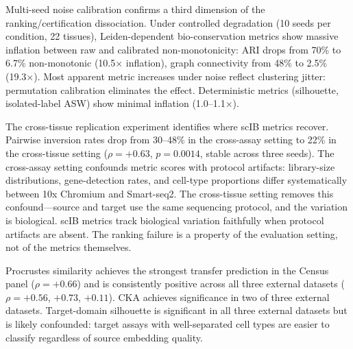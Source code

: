 \documentclass[11pt]{article}
\begin{document}
Multi-seed noise calibration confirms a third dimension of the
ranking/certification dissociation. Under controlled degradation (10
seeds per condition, 22 tissues), Leiden-dependent bio-conservation
metrics show massive inflation between raw and calibrated
non-monotonicity: ARI drops from 70\% to 6.7\% non-monotonic
(10.5$\times$ inflation), graph connectivity from 48\% to 2.5\%
(19.3$\times$). Most apparent metric increases under noise reflect
clustering jitter: permutation calibration eliminates the effect.
Deterministic metrics (silhouette, isolated-label ASW) show minimal
inflation (1.0--1.1$\times$).

The cross-tissue replication experiment identifies where scIB metrics
recover. Pairwise inversion rates drop from 30--48\% in the cross-assay
setting to 22\% in the cross-tissue setting ($\rho = +0.63$,
$p = 0.0014$, stable across three seeds). The cross-assay setting
confounds metric scores with protocol artifacts: library-size
distributions, gene-detection rates, and cell-type proportions differ
systematically between 10x Chromium and Smart-seq2. The cross-tissue
setting removes this confound---source and target use the same
sequencing protocol, and the variation is biological. scIB metrics track
biological variation faithfully when protocol artifacts are absent. The
ranking failure is a property of the evaluation setting, not of the
metrics themselves.

Procrustes similarity achieves the strongest transfer prediction in the
Census panel ($\rho = +0.66$) and is consistently positive across all
three external datasets ($\rho = +0.56$, $+0.73$, $+0.11$). CKA
achieves significance in two of three external datasets. Target-domain
silhouette is significant in all three external datasets but is likely
confounded: target assays with well-separated cell types are easier to
classify regardless of source embedding quality.
\end{document}
